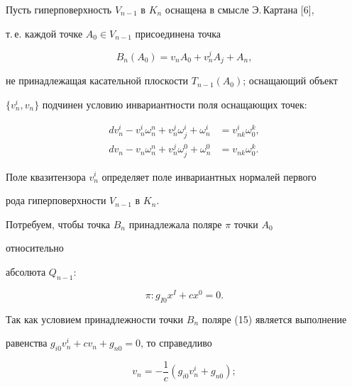  


Пусть гиперповерхность $V_{n-1}$ в $K_n$ оснащена в смысле Э.\,Картана [6], 


т.\,е. каждой точке $A_0\in V_{n-1}$ присоединена точка 


\begin{equation} 


B_n(A_0)=v_n A_0+v^j_n A_j+A_n, 


\end{equation} 


не принадлежащая касательной плоскости $T_{n-1}(A_0)$; оснащающий объект 


$\{v^i_n,v_n\}$ подчинен условию инвариантности поля оснащающих точек: 


\begin{align*} 


dv^i_n-v^i_n\omega^n_n+v^j_n\omega^i_j+\omega^i_n&= 


v^i_{nk}\omega^k_0,\\ 


% 


dv_n-v_n\omega^n_n+v^j_n\omega^0_j+\omega^0_n&= 


v_{nk}\omega^k_0. 


\end{align*} 


 


Поле квазитензора $v^i_n$ определяет поле инвариантных нормалей первого 


рода гиперповерхности $V_{n-1}$ в $K_n$. 


 


Потребуем, чтобы точка $B_n$ принадлежала поляре $\pi$ точки $A_0$ 


относительно 


абсолюта $Q_{n-1}$: 


\begin{equation} 


\pi:g_{I0}x^I+c x^0=0. 


\end{equation} 


Так как условием принадлежности точки $B_n$ поляре (15) является выполнение 


равенства $g_{i0}v^i_n+c v_n+g_{n0}=0$, то справедливо 


\begin{equation} 


v_n=-\frac{1}{c}(g_{i0}v^i_n+g_{n0}); 


\end{equation} 



